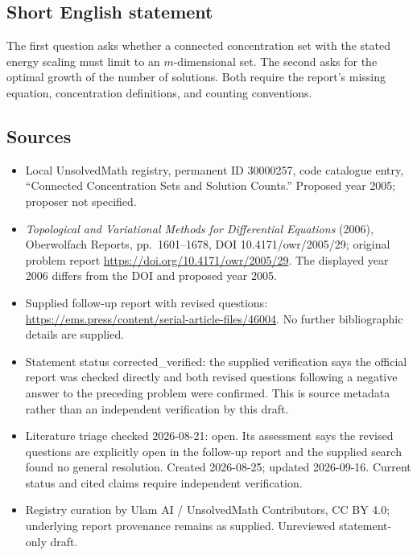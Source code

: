 \documentclass[11pt]{article}
\begin{document}
\subsection{Short English statement}
The first question asks whether a connected concentration set with the stated energy scaling must limit to an $m$-dimensional set. The second asks for the optimal growth of the number of solutions. Both require the report's missing equation, concentration definitions, and counting conventions.
\subsection{Sources}
\begin{itemize}
\item Local UnsolvedMath registry, permanent ID 30000257, code catalogue entry, ``Connected Concentration Sets and Solution Counts.'' Proposed year 2005; proposer not specified.
\item \emph{Topological and Variational Methods for Differential Equations} (2006), Oberwolfach Reports, pp.\ 1601--1678, DOI 10.4171/owr/2005/29; original problem report \url{https://doi.org/10.4171/owr/2005/29}. The displayed year 2006 differs from the DOI and proposed year 2005.
\item Supplied follow-up report with revised questions: \url{https://ems.press/content/serial-article-files/46004}. No further bibliographic details are supplied.
\item Statement status corrected\_verified: the supplied verification says the official report was checked directly and both revised questions following a negative answer to the preceding problem were confirmed. This is source metadata rather than an independent verification by this draft.
\item Literature triage checked 2026-08-21: open. Its assessment says the revised questions are explicitly open in the follow-up report and the supplied search found no general resolution. Created 2026-08-25; updated 2026-09-16. Current status and cited claims require independent verification.
\item Registry curation by Ulam AI / UnsolvedMath Contributors, CC BY 4.0; underlying report provenance remains as supplied. Unreviewed statement-only draft.
\end{itemize}
\end{document}
